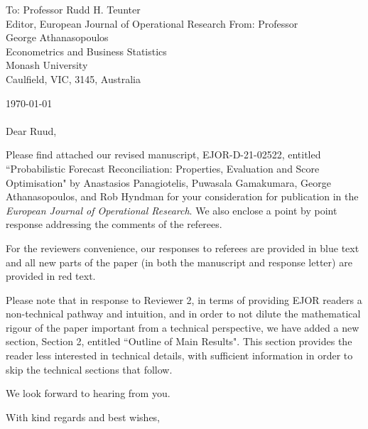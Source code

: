 \documentclass[11pt,a4paper]{letter}
\date{}
\begin{document}
 \begin{letter}{To: Professor Rudd H. Teunter\\
    Editor, European Journal of Operational Research}
    From: Professor\\
    George Athanasopoulos\\
    Econometrics and Business Statistics\\
    Monash University\\
    Caulfield, VIC, 3145, Australia

 \opening{\today\ \\\\Dear Ruud,}
 \medskip

Please find attached our revised manuscript, EJOR-D-21-02522, entitled ``Probabilistic Forecast Reconciliation: Properties, Evaluation and Score Optimisation" by Anastasios Panagiotelis, Puwasala Gamakumara, George Athanasopoulos, and Rob Hyndman for your consideration for publication in the \textit{European Journal of Operational Research}. We also enclose a point by point response addressing the comments of the referees.

For the reviewers convenience, our responses to referees are provided in {\color{blue} blue} text and all new parts of the paper (in both the manuscript and response letter) are provided in {\color{red} red} text.

Please note that in response to Reviewer 2, in terms of providing EJOR readers a non-technical pathway and intuition, and in order to not dilute the mathematical rigour of the paper important from a technical perspective, we have added a new section, Section 2, entitled ``Outline of Main Results". This section provides the reader less interested in technical details, with sufficient information in order to skip the technical sections that follow.

We look forward to hearing from you.

 \closing{With kind regards and best wishes,}

 \end{letter}
\end{document}
